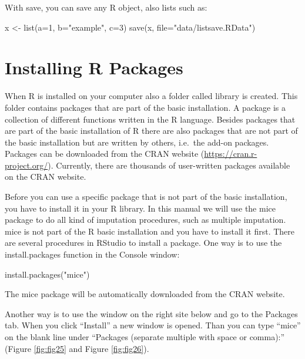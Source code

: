 \documentclass[
]{book}
\newenvironment{Shaded}{\begin{snugshade}}{\end{snugshade}}
\newcommand{\AttributeTok}[1]{\textcolor[rgb]{0.77,0.63,0.00}{#1}}
\newcommand{\DecValTok}[1]{\textcolor[rgb]{0.00,0.00,0.81}{#1}}
\newcommand{\FunctionTok}[1]{\textcolor[rgb]{0.00,0.00,0.00}{#1}}
\newcommand{\NormalTok}[1]{#1}
\newcommand{\OtherTok}[1]{\textcolor[rgb]{0.56,0.35,0.01}{#1}}
\newcommand{\StringTok}[1]{\textcolor[rgb]{0.31,0.60,0.02}{#1}}
\begin{document}
With save, you can save any R object, also lists such as:

\begin{Shaded}
\begin{Highlighting}[]
\NormalTok{x }\OtherTok{\textless{}{-}} \FunctionTok{list}\NormalTok{(}\AttributeTok{a=}\DecValTok{1}\NormalTok{, }\AttributeTok{b=}\StringTok{"example"}\NormalTok{, }\AttributeTok{c=}\DecValTok{3}\NormalTok{)}
\FunctionTok{save}\NormalTok{(x, }\AttributeTok{file=}\StringTok{"data/listsave.RData"}\NormalTok{)}
\end{Highlighting}
\end{Shaded}

\hypertarget{installing-r-packages}{%
\section{Installing R Packages}\label{installing-r-packages}}

When R is installed on your computer also a folder called library is created. This folder contains packages that are part of the basic installation. A package is a collection of different functions written in the R language. Besides packages that are part of the basic installation of R there are also packages that are not part of the basic installation but are written by others, i.e.~the add-on packages. Packages can be downloaded from the CRAN website (\url{https://cran.r-project.org/}). Currently, there are thousands of user-written packages available on the CRAN website.

Before you can use a specific package that is not part of the basic installation, you have to install it in your R library. In this manual we will use the mice package to do all kind of imputation procedures, such as multiple imputation. mice is not part of the R basic installation and you have to install it first. There are several procedures in RStudio to install a package. One way is to use the install.packages function in the Console window:

\begin{Shaded}
\begin{Highlighting}[]
\FunctionTok{install.packages}\NormalTok{(}\StringTok{"mice"}\NormalTok{)}
\end{Highlighting}
\end{Shaded}

The mice package will be automatically downloaded from the CRAN website.

Another way is to use the window on the right site below and go to the Packages tab. When you click ``Install'' a new window is opened. Than you can type ``mice'' on the blank line under ``Packages (separate multiple with space or comma):'' (Figure \ref{fig:fig25} and Figure \ref{fig:fig26}).
\end{document}
